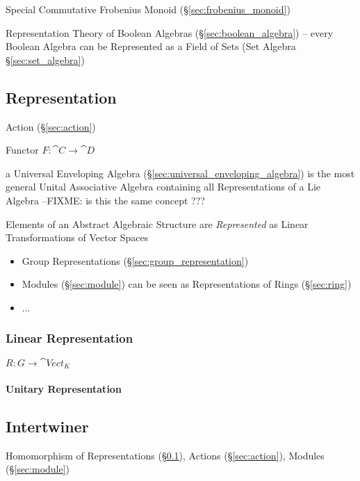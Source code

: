 Special Commutative Frobenius Monoid (\S\ref{sec:frobenius_monoid})

Representation Theory of Boolean Algebras (\S\ref{sec:boolean_algebra}) -- every
Boolean Algebra can be Represented as a Field of Sets (Set Algebra
\S\ref{sec:set_algebra})



\subsection{Representation}\label{sec:representation}

Action (\S\ref{sec:action})

Functor $F : \cat{C} \rightarrow \cat{D}$

\fist a Universal Enveloping Algebra (\S\ref{sec:universal_enveloping_algebra})
is the most general Unital Associative Algebra containing all Representations
of a Lie Algebra
--FIXME: is this the same concept ???

Elements of an Abstract Algebraic Structure are \emph{Represented} as Linear
Transformations of Vector Spaces

\begin{itemize}
  \item Group Representations (\S\ref{sec:group_representation})
  \item Modules (\S\ref{sec:module}) can be seen as Representations of Rings
    (\S\ref{sec:ring})
  \item ...
\end{itemize}




\subsubsection{Linear Representation}\label{sec:linear_representation}

$R : G \rightarrow \cat{Vect}_K$



\paragraph{Unitary Representation}\label{sec:unitary_representation}



\subsection{Intertwiner}\label{sec:intertwiner}

Homomorphism of Representations (\S\ref{sec:representation}), Actions
(\S\ref{sec:action}), Modules (\S\ref{sec:module})

